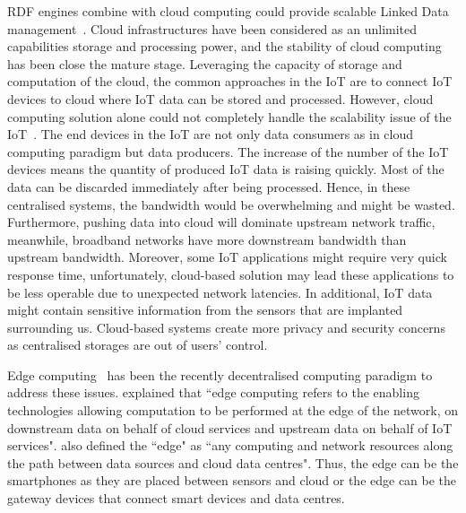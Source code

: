 RDF engines combine with cloud computing could provide scalable Linked Data management~\citep{Hauswirth:2017}.
Cloud infrastructures have been considered as an unlimited capabilities storage and processing power, and the stability of cloud computing has been close the mature stage.
Leveraging the capacity of storage and computation of the cloud, the common approaches in the IoT are to connect IoT devices to cloud where IoT data can be stored and processed.
However, cloud computing solution alone could not completely handle the scalability issue of the IoT~\citep{Zhang:2015}.
The end devices in the IoT are not only data consumers as in cloud computing paradigm but data producers.
The increase of the number of the IoT devices means the quantity of produced IoT data is raising quickly.
Most of the data can be discarded immediately after being processed.
Hence, in these centralised systems, the bandwidth would be overwhelming and might be wasted.
Furthermore, pushing data into cloud will dominate upstream network traffic, meanwhile, broadband networks have more downstream bandwidth than upstream bandwidth.
Moreover, some IoT applications might require very quick response time, unfortunately, cloud-based solution may lead these applications to be less operable due to unexpected network latencies.
In additional, IoT data might contain sensitive information from the sensors that are implanted surrounding us.
Cloud-based systems create more privacy and security concerns as centralised storages are out of users' control.

Edge computing~\citep{Salman:2015} has been the recently decentralised computing paradigm to address these issues.
\cite{WShi:2016} explained that ``edge computing refers to the enabling technologies allowing computation to be performed at the edge of the network,
on downstream data on behalf of cloud services and upstream data on behalf of IoT services".
\cite{WShi:2016} also defined the ``edge" as ``any computing and network resources along the path between data sources and cloud data centres".
Thus, the edge can be the smartphones as they are placed between sensors and cloud or the edge can be the gateway devices that connect smart devices and data centres.


